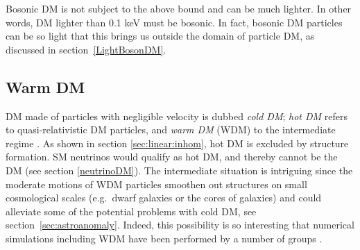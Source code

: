 Bosonic DM is not subject to the above bound and can be much lighter. 
In other words, DM lighter than 0.1 keV must be bosonic. 
In fact, bosonic DM particles can be so light that this brings us outside the domain of particle DM,
as discussed in section~\ref{LightBosonDM}.


\subsection{Warm DM}
\label{sec:WarmDM}

DM made of particles with negligible velocity is dubbed {\em cold DM};
{\em hot DM} refers to quasi-relativistic DM particles,
and {\em warm DM} (WDM) to the intermediate regime \cite{WarmDMhistory}.
As shown in section \ref{sec:linear:inhom}, hot DM is excluded by structure formation.
SM neutrinos would qualify as hot DM, and thereby cannot be the DM (see section \ref{neutrinoDM}). 
The intermediate situation is intriguing since the moderate motions of WDM particles smoothen out structures on small cosmological scales (e.g.~dwarf galaxies or the cores of galaxies) and could alleviate some of the potential problems with cold DM, see section~\ref{sec:astroanomaly}. Indeed, this possibility is so interesting that  numerical simulations including WDM have been performed by a number of groups \cite{Sims_alt_DM}.

\smallskip

